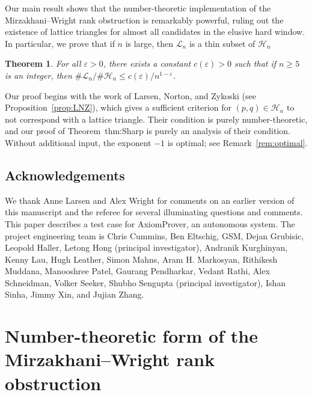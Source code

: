 \documentclass[12pt]{amsart}
\newtheorem{theorem}{Theorem}[section]
\theoremstyle{definition}
\begin{document}
Our main result shows that the number-theoretic implementation of the Mirzakhani--Wright rank obstruction is remarkably powerful, ruling out the existence of lattice triangles for almost all candidates in the elusive hard window.  In particular, we prove that if $n$ is large, then $\mathcal{L}_n$ is a thin subset of $\mathcal{H}_n$

\begin{theorem}
\label{thm:Sharp}
For all $\varepsilon>0$, there exists a constant $c(\varepsilon)>0$ such that if $n\geq 5$ is an integer, then $\#\mathcal{L}_n / \#\mathcal{H}_n\leq c(\varepsilon)/n^{1-\varepsilon}$.
\end{theorem}

Our proof begins with the work of Larsen, Norton, and Zykoski (see Proposition~\ref{prop:LNZ}), which gives a sufficient criterion for $(p,q)\in\mathcal{H}_n$ to not correspond with a lattice triangle.  Their condition is purely number-theoretic, and our proof of Theorem~{thm:Sharp} is purely an analysis of their condition.  Without additional input, the exponent $-1$ is optimal; see Remark~\ref{rem:optimal}.


\subsection*{Acknowledgements}

We thank Anne Larsen and Alex Wright for comments on an earlier version of this manuscript and the referee for several illuminating questions and comments.
This paper describes a test case for AxiomProver, an autonomous system.  The project engineering team is Chris Cummins, Ben Eltschig, GSM, Dejan Grubisic, Leopold Haller, Letong Hong (principal investigator), Andranik Kurghinyan, Kenny Lau, Hugh Leather, Simon Mahns, Aram H. Markosyan, Rithikesh Muddana, Manooshree Patel, Gaurang Pendharkar, Vedant Rathi, Alex Schneidman, Volker Seeker, Shubho Sengupta (principal investigator), Ishan Sinha, Jimmy Xin, and Jujian Zhang.

\section{Number-theoretic form of the Mirzakhani--Wright rank obstruction}
\label{sec:RankObstruct}
\end{document}
